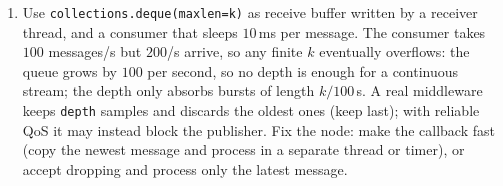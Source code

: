\begin{enumerate}[label=\textbf{\ansnum.\arabic*}]
  \item[\textbf{\ansnum.10}] Use \verb!collections.deque(maxlen=k)! as receive buffer written by a receiver thread, and a consumer that sleeps $10$\,ms per message. The consumer takes $100$ messages/s but $200$/s arrive, so any finite $k$ eventually overflows: the queue grows by $100$ per second, so no depth is enough for a continuous stream; the depth only absorbs bursts of length $k/100$\,s. A real middleware keeps \verb!depth! samples and discards the oldest ones (keep last); with reliable QoS it may instead block the publisher. Fix the node: make the callback fast (copy the newest message and process in a separate thread or timer), or accept dropping and process only the latest message.
\end{enumerate}

